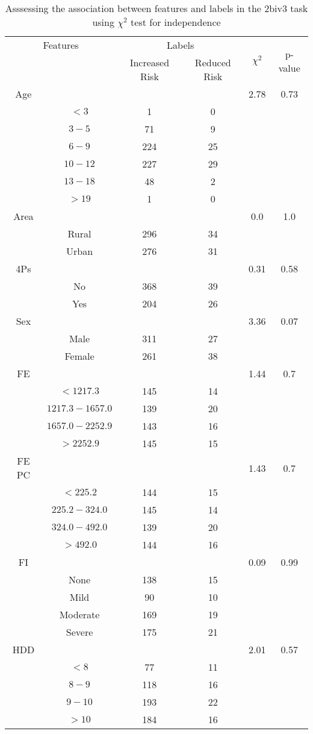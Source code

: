 \begin{table}[!htb]
\centering
\caption{Asssessing the association between features and labels in the 2biv3 task using $\chi^2$ test for independence}
\label{tab:chitest_2biv3}
\begin{tabular}{c c | c c| c | c}
\hline
\multicolumn{2}{c|}{Features}& \multicolumn{2}{c|}{Labels}& \multirow{2}{*}{$\chi^2$} & \multirow{2}{*}{p-value}\\ 
& & Increased Risk & Reduced Risk & & \\ 
\hline
Age &  &  & & 2.78 & 0.73 \\ 
& $< 3$ & 1 & 0& & \\ 
& $3-5$ & 71 & 9& & \\ 
& $6-9$ & 224 & 25& & \\ 
& $10-12$ & 227 & 29& & \\ 
& $13-18$ & 48 & 2& & \\ 
& $> 19$ & 1 & 0& & \\ 
\hline 
Area &  &  & & 0.0 & 1.0 \\ 
& Rural & 296 & 34& & \\ 
& Urban & 276 & 31& & \\ 
\hline 
4Ps &  &  & & 0.31 & 0.58 \\ 
& No & 368 & 39& & \\ 
& Yes & 204 & 26& & \\ 
\hline 
Sex &  &  & & 3.36 & 0.07 \\ 
& Male & 311 & 27& & \\ 
& Female & 261 & 38& & \\ 
\hline 
FE &  &  & & 1.44 & 0.7 \\ 
& $< 1217.3$ & 145 & 14& & \\ 
& $1217.3-1657.0$ & 139 & 20& & \\ 
& $1657.0-2252.9$ & 143 & 16& & \\ 
& $> 2252.9$ & 145 & 15& & \\ 
\hline 
FE PC &  &  & & 1.43 & 0.7 \\ 
& $< 225.2$ & 144 & 15& & \\ 
& $225.2-324.0$ & 145 & 14& & \\ 
& $324.0-492.0$ & 139 & 20& & \\ 
& $> 492.0$ & 144 & 16& & \\ 
\hline 
FI &  &  & & 0.09 & 0.99 \\ 
& None & 138 & 15& & \\ 
& Mild & 90 & 10& & \\ 
& Moderate & 169 & 19& & \\ 
& Severe & 175 & 21& & \\ 
\hline 
HDD &  &  & & 2.01 & 0.57 \\ 
& $< 8$ & 77 & 11& & \\ 
& $8-9$ & 118 & 16& & \\ 
& $9-10$ & 193 & 22& & \\ 
& $> 10$ & 184 & 16& & \\ 
\hline 
\end{tabular}
\end{table}

